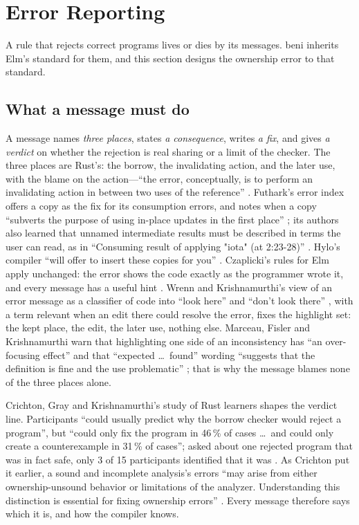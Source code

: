 \section{Error Reporting}
\label{sec:errors}

A rule that rejects correct programs lives or dies by its messages. beni inherits Elm's standard for
them, and this section designs the ownership error to that standard.

\subsection{What a message must do}
\label{sec:errors-principles}

A message names \emph{three places}, states \emph{a consequence}, writes \emph{a fix}, and gives
\emph{a verdict} on whether the rejection is real sharing or a limit of the checker. The three places
are Rust's: the borrow, the invalidating action, and the later use, with the blame on the action---``the
error, conceptually, is to perform an invalidating action in between two uses of the reference''
\citep{rfc2094}. Futhark's error index offers a copy as the fix for its consumption errors, and notes
when a copy ``subverts the purpose of using in-place updates in the first place''
\citep{futhark2026errorindex}; its authors also learned that unnamed intermediate results must be
described in terms the user can read, as in ``Consuming result of applying "iota" (at 2:23-28)''
\citep{henriksen2021anatomy}. Hylo's compiler ``will offer to insert these copies for you''
\citep{hylo2024bindings}. Czaplicki's rules for Elm apply unchanged: the error shows the code exactly as
the programmer wrote it, and every message has a useful hint \citep{czaplicki2015errors}. Wrenn and
Krishnamurthi's view of an error message as a classifier of code into ``look here'' and ``don't look
there'' \citep[\S2]{wrenn2017classifiers}, with a term relevant when an edit there could resolve the
error, fixes the highlight set: the kept place, the edit, the later use, nothing else. Marceau, Fisler
and Krishnamurthi warn that highlighting one side of an inconsistency has ``an over-focusing effect''
and that ``expected \ldots\ found'' wording ``suggests that the definition is fine and the use
problematic'' \citep[\S7.2]{marceau2011mind}; that is why the message blames none of the three places
alone.

Crichton, Gray and Krishnamurthi's study of Rust learners shapes the verdict line. Participants ``could
usually predict why the borrow checker would reject a program'', but ``could only fix the program in
46\,\% of cases \ldots\ and could only create a counterexample in 31\,\% of cases''; asked about one
rejected program that was in fact safe, only 3 of 15 participants identified that it was
\citep[\S2.4]{crichton2023grounded}. As Crichton put it earlier, a sound and incomplete analysis's
errors ``may arise from either ownership-unsound behavior or limitations of the analyzer.
Understanding this distinction is essential for fixing ownership errors''
\citep{crichton2020usability}. Every message therefore says which it is, and how the compiler knows.

